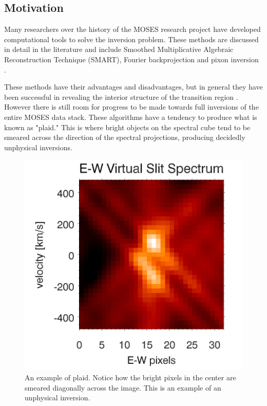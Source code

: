 \documentclass[twoside]{article}
\begin{document}
\begin{multicols}{2}
\section{Motivation}

Many researchers over the history of the MOSES research project have developed computational tools to solve the inversion problem. These methods are discussed in detail in the literature and include Smoothed Multiplicative Algebraic Reconstruction Technique (SMART)\cite{smart}, Fourier backprojection and pixon inversion \cite{inversion}. 
\par These methods have their advantages and disadvantages, but in general they have been successful in revealing the interior structure of the transition region \cite{moses}. However there is still room for progress to be made towards full inversions of the entire MOSES data stack. These algorithms have a tendency to produce what is known as "plaid." This is where bright objects on the spectral cube tend to be smeared across the direction of the spectral projections, producing decidedly unphysical inversions.

\begin{figure}[H]
	\includegraphics[width=\linewidth]{images/plaid2}
	\caption{An example of plaid. Notice how the bright pixels in the center are smeared diagonally across the image. This is an example of an unphysical inversion. \cite{tom} }
\end{figure} 


\end{multicols}
\end{document}
